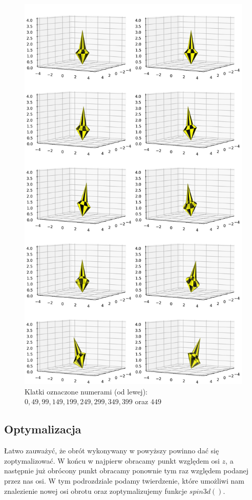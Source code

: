 \documentclass[a4paper,twoside,11pt,reqno]{mwrep}
\theoremstyle{plain} \newtheorem{twr}{Twierdzenie}
\theoremstyle{plain} \newtheorem{lem}{Lemat}
\theoremstyle{definition} \newtheorem{defi}{Definicja}
\theoremstyle{remark} \newtheorem*{wni}{Wniosek}
\theoremstyle{definition} \newtheorem{uwaga}{Uwaga}
\theoremstyle{definition}\newtheorem{prz}{Przykład}
\begin{document}
\begin{figure}

\begin{center}
\includegraphics[width=14 cm]{Merged_quaternion.png}
\caption{Klatki oznaczone numerami (od lewej): $0,49,99,149,199,249,299,349,399$ oraz $449$}
\end{center}

\end{figure}
\newpage
\subsection{Optymalizacja}
Łatwo zauważyć, że obrót wykonywany w powyższy powinno dać się zoptymalizować.
W końcu w najpierw obracamy punkt względem osi $z$, a następnie już obrócony punkt  
obracamy ponownie tym raz względem podanej przez nas osi. W tym podrozdziale 
podamy twierdzenie, które umożliwi nam znalezienie nowej osi obrotu oraz  
zoptymalizujemy funkcje $spin3d()$.
\end{document}
